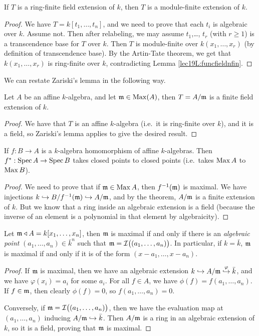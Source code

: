  \begin{lemma}[Zariski]
   If $T$ is a ring-finite field extension of $k$, then $T$ is a module-finite extension
   of $k$.
 \end{lemma}
 \begin{proof}
   We have $T=k[t_1,\dots, t_n]$, and we need to prove that each $t_i$ is algebraic over
   $k$. Assume not. Then after relabeling, we may assume $t_1$,\dots, $t_r$ (with $r\ge
   1$) is a transcendence base for $T$ over $k$. Then $T$ is module-finite over
   $k(x_1,\dots, x_r)$ (by definition of transcendence base). By the Artin-Tate theorem,
   we get that $k(x_1,\dots, x_r)$ is ring-finite over $k$, contradicting Lemma
   \ref{lec19L:funcfieldnfin}.
 \end{proof}
 We can restate Zariski's lemma in the following way.
 \begin{theorem}
   Let $A$ be an affine $k$-algebra, and let $\mathfrak{m}\in \operatorname{Max}(A)$, then $T=A/\mathfrak{m}$ is a finite
   field extension of $k$.
 \end{theorem}
 \begin{proof}
   We have that $T$ is an affine $k$-algebra (i.e.\ it is ring-finite over $k$), and it
   is a field, so Zariski's lemma applies to give the desired result.
 \end{proof}
 \begin{corollary} \label{lec20C:1}
   If $f:B\to A$ is a $k$-algebra homomorphism of affine $k$-algebras. Then $f^*:\operatorname{Spec}
   A\to \operatorname{Spec} B$ takes closed points to closed points (i.e.\ takes $\operatorname{Max} A$ to $\operatorname{Max} B$).
 \end{corollary}
 \begin{proof}
   We need to prove that if $\mathfrak{m}\in \operatorname{Max} A$, then $f^{-1}(\mathfrak{m})$ is maximal. We have
   injections $k\hookrightarrow B/f^{-1}(\mathfrak{m})\hookrightarrow A/\mathfrak{m}$, and by the theorem,
   $A/\mathfrak{m}$ is a finite extension of $k$. But we know that a ring inside an algebraic
   extension is a field (because the inverse of an element is a polynomial in that
   element by algebraicity).
 \end{proof}
 \begin{corollary}
   Let $\mathfrak{m}\triangleleft A=k[x_1,\dots, x_n]$, then $\mathfrak{m}$ is maximal if and only if there is an
   \emph{algebraic point} $(a_1,\dots, a_n)\in \bar k^n$ such that
   $\mathfrak{m}=\mathcal{I}\bigl((a_1,\dots, a_n)\bigr)$. In particular, if $k=\bar k$, $\mathfrak{m}$ is maximal if
   and only if it is of the form $(x-a_1,\dots, x-a_n)$.
 \end{corollary}
 \begin{proof}
   If $\mathfrak{m}$ is maximal, then we have an algebraic extension $k\hookrightarrow
   A/\mathfrak{m}\stackrel{\varphi}{\hookrightarrow} \bar k$, and we have $\varphi(x_i)=a_i$ for
   some $a_i$. For all $f\in A$, we have $\phi(f)=f(a_1,\dots, a_n)$. If $f\in \mathfrak{m}$, then
   clearly $\phi(f)=0$, so $f(a_1,\dots, a_n)=0$.

   Conversely, if $\mathfrak{m}=\mathcal{I}\bigl((a_1,\dots, a_n)\bigr)$, then we have the evaluation map at
   $(a_1,\dots, a_n)$ inducing $A/\mathfrak{m}\hookrightarrow \bar k$. Then $A/\mathfrak{m}$ is a ring in an
   algebraic extension of $k$, so it is a field, proving that $\mathfrak{m}$ is maximal.
 \end{proof}
